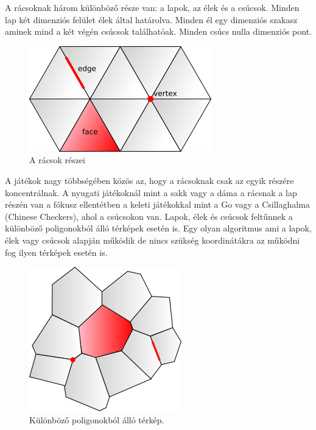 
A rácsoknak három különböző része van: a lapok, az élek és a csúcsok. Minden lap két dimenziós felület élek által határolva. Minden él egy dimenziós szakasz aminek mind a két végén csúcsok találhatóak. Minden csúcs nulla dimenziós pont. 

\begin{figure}[h]
\centering
\includegraphics[scale=0.5]{kepek/img31.png}
\caption{A rácsok részei}
\label{fig:img31}
\end{figure}

\noindent A játékok nagy többségében közös az, hogy a rácsoknak csak az egyik részére koncentrálnak. A nyugati játékoknál mint a sakk vagy a dáma a rácsnak a lap részén van a fókusz ellentétben a keleti játékokkal mint a Go vagy a Csillaghalma (Chinese Checkers), ahol a csúcsokon van.
\newline
\newline Lapok, élek és csúcsok feltűnnek a különböző poligonokból álló  térképek esetén is. Egy olyan algoritmus ami a lapok, élek vagy csúcsok alapján működik de nincs szükség koordinátákra az működni fog ilyen térképek esetén is.

\begin{figure}[h]
\centering
\includegraphics[scale=0.5]{kepek/img32.png}
\caption{Különböző poligonokból álló térkép.}
\label{fig:img32}
\end{figure}

